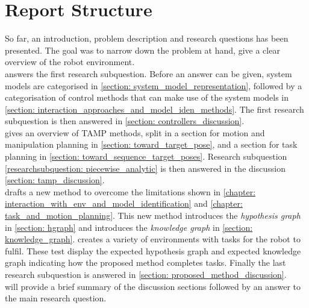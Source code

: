 \section{Report Structure}
\label{section: report_structure}
So far, an introduction, problem description and research questions has been presented. The goal was to narrow down the problem at hand, give a clear overview of the robot environment. \\

 answers the first research subquestion. Before an answer can be given, system models are categorised in  \cref{section: system_model_representation}, followed by a categorisation of control methods that can make use of the system models in \cref{section: interaction_approaches_and_model_iden_methods}. The first research subquestion is then answered in \cref{section: controllers_discussion}.\\

 gives an overview of \ac{TAMP} methods, split in a section for motion and manipulation planning in \cref{section: toward_target_pose}, and a section for task planning in \cref{section: toward_sequence_target_poses}.
Research subquestion \cref{researchsubquestion: piecewise_analytic} is then answered in the discussion \cref{section: tamp_discussion}.\\

 drafts a new method to overcome the limitations shown in \cref{chapter: interaction_with_env_and_model_identification} and \cref{chapter: task_and_motion_planning}. This new method introduces the \textit{hypothesis graph} in \cref{section: hgraph} and introduces the \textit{knowledge graph} in  
\cref{section: knowledge_graph}.  creates a variety of environments with tasks for the robot to fulfil. These test display the expected hypothesis graph and expected knowledge graph indicating how the proposed method completes tasks. Finally the last research subquestion is answered in \cref{section: proposed_method_discussion}. \\

 will provide a brief summary of the discussion sections followed by an answer to the main research question. 

